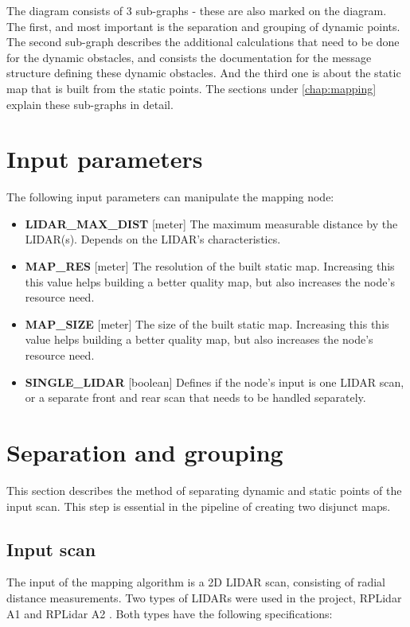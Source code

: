The diagram consists of 3 sub-graphs - these are also marked on the diagram. The first, and most important is the separation and grouping of dynamic points. The second sub-graph describes the additional calculations that need to be done for the dynamic obstacles, and consists the documentation for the message structure defining these dynamic obstacles. And the third one is about the static map that is built from the static points. The sections under \ref{chap:mapping} explain these sub-graphs in detail.

\begin{minipage}{\textwidth}
\section{Input parameters}
\label{chap:mapping_input_parameters}
The following input parameters can manipulate the mapping node:

\begin{itemize}
\item\textbf{LIDAR\_MAX\_DIST} [meter] The maximum measurable distance by the LIDAR(s). Depends on the LIDAR's characteristics.
\item\textbf{MAP\_RES} [meter] The resolution of the built static map. Increasing this this value helps building a better quality map, but also increases the node's resource need.
\item\textbf{MAP\_SIZE} [meter] The size of the built static map. Increasing this this value helps building a better quality map, but also increases the node's resource need.
\item \textbf{SINGLE\_LIDAR} [boolean] Defines if the node's input is one LIDAR scan, or a separate front and rear scan that needs to be handled separately.
\end{itemize}
\end{minipage}

\section{Separation and grouping}
\label{chap:separation_and_grouping}
This section describes the method of separating dynamic and static points of the input scan. This step is essential in the pipeline of creating two disjunct maps.

\subsection{Input scan}
The input of the mapping algorithm is a 2D LIDAR scan, consisting of radial distance measurements. Two types of LIDARs were used in the project, RPLidar A1 \cite{rplidar_a1} and RPLidar A2 \cite{rplidar_a2}.
Both types have the following specifications:

